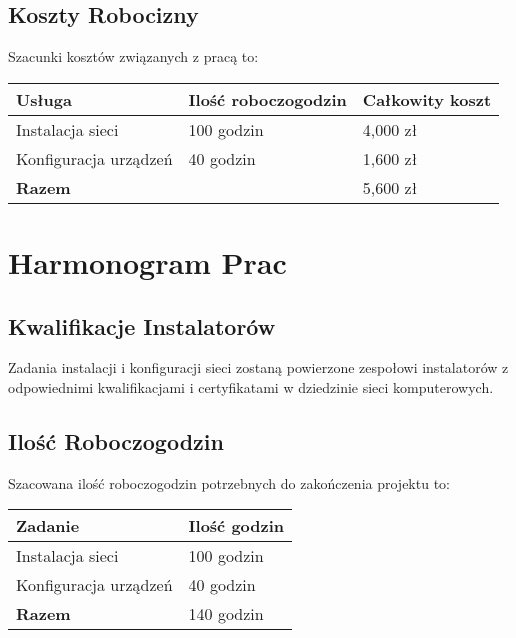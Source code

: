     \subsection{Koszty Robocizny}
        Szacunki kosztów związanych z pracą to:

        \begin{flushleft}
            \renewcommand{\arraystretch}{1.5}
            \begin{tabular}{|l|l|l|}
            \hline
                \textbf{Usługa} & \textbf{Ilość roboczogodzin} & \textbf{Całkowity koszt} \\
            \hline
                Instalacja sieci & 100 godzin & 4,000 zł \\
                Konfiguracja urządzeń & 40 godzin & 1,600 zł \\
            \hline
                \textbf{Razem} & & 5,600 zł \\
            \hline
            \end{tabular}
        \end{flushleft}

\section{Harmonogram Prac}

    \subsection{Kwalifikacje Instalatorów}
        Zadania instalacji i konfiguracji sieci zostaną powierzone zespołowi instalatorów z odpowiednimi kwalifikacjami i certyfikatami w dziedzinie sieci komputerowych.

    \subsection{Ilość Roboczogodzin}
        Szacowana ilość roboczogodzin potrzebnych do zakończenia projektu to:

        \begin{flushleft}
            \renewcommand{\arraystretch}{1.5}
            \begin{tabular}{|l|l|}
            \hline
                \textbf{Zadanie} & \textbf{Ilość godzin} \\
            \hline
                Instalacja sieci & 100 godzin \\
                Konfiguracja urządzeń & 40 godzin \\
            \hline
                \textbf{Razem} & 140 godzin \\
            \hline
            \end{tabular}
        \end{flushleft}

